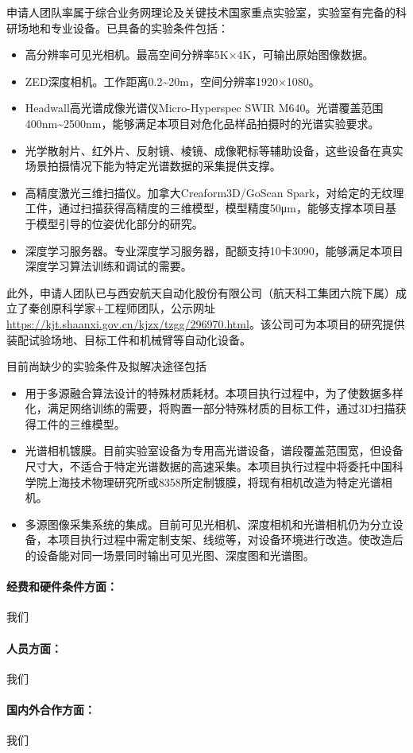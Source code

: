 \documentclass[12pt]{article}
\newcommand{\myPara}[1]{\paragraph{#1：}}
\begin{document}
申请人团队率属于综合业务网理论及关键技术国家重点实验室，实验室有完备的科研场地和专业设备。已具备的实验条件包括：
\begin{itemize}
    \item 高分辨率可见光相机。最高空间分辨率5K×4K，可输出原始图像数据。
    \item ZED深度相机。工作距离0.2\textasciitilde20m，空间分辨率1920×1080。
    \item Headwall高光谱成像光谱仪Micro-Hyperspec SWIR M640。光谱覆盖范围400nm\textasciitilde2500nm，能够满足本项目对危化品样品拍摄时的光谱实验要求。
    \item 光学散射片、红外片、反射镜、棱镜、成像靶标等辅助设备，这些设备在真实场景拍摄情况下能为特定光谱数据的采集提供支撑。
    \item 高精度激光三维扫描仪。加拿大Creaform3D/GoScan Spark，对给定的无纹理工件，通过扫描获得高精度的三维模型，模型精度50μm，能够支撑本项目基于模型引导的位姿优化部分的研究。
    \item 深度学习服务器。专业深度学习服务器，配额支持10卡3090，能够满足本项目深度学习算法训练和调试的需要。
\end{itemize}
此外，申请人团队已与西安航天自动化股份有限公司（航天科工集团六院下属）成立了秦创原科学家+工程师团队，公示网址\url{https://kjt.shaanxi.gov.cn/kjzx/tzgg/296970.html}。该公司可为本项目的研究提供装配试验场地、目标工件和机械臂等自动化设备。

目前尚缺少的实验条件及拟解决途径包括
\begin{itemize}
    \item 用于多源融合算法设计的特殊材质耗材。本项目执行过程中，为了使数据多样化，满足网络训练的需要，将购置一部分特殊材质的目标工件，通过3D扫描获得工件的三维模型。
    \item 光谱相机镀膜。目前实验室设备为专用高光谱设备，谱段覆盖范围宽，但设备尺寸大，不适合于特定光谱数据的高速采集。本项目执行过程中将委托中国科学院上海技术物理研究所或8358所定制镀膜，将现有相机改造为特定光谱相机。
    \item 多源图像采集系统的集成。目前可见光相机、深度相机和光谱相机仍为分立设备，本项目执行过程中需定制支架、线缆等，对设备环境进行改造。使改造后的设备能对同一场景同时输出可见光图、深度图和光谱图。
\end{itemize}



\myPara{经费和硬件条件方面}我们


\myPara{人员方面}我们

\myPara{国内外合作方面} 我们


\end{document}
